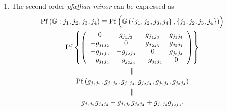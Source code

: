 \documentclass[aps,preprint]{revtex4}%
\begin{document}
\begin{enumerate}
\begin{enumerate}
\end{enumerate}

\item The second order \emph{pfaffian minor} can be expressed as
\begin{gather}
\operatorname{Pf}\left(  \mathbb{G}:j_{1},j_{2},j_{3},j_{4}\right)
\equiv\operatorname{Pf}\left(  \overset{}{\mathbb{G}\left(  \left\{
j_{1},j_{2},j_{3},j_{4}\right\}  ,\left\{  j_{1},j_{2},j_{3},j_{4}\right\}
\right)  }\right) \\
\operatorname{Pf}\left\{  \left(
\begin{array}
[c]{cccc}%
0 & g_{j_{1}j_{2}} & g_{j_{1}j_{3}} & g_{j_{1}j_{4}}\\
-g_{j_{1}j_{2}} & 0 & g_{j_{2}j_{3}} & g_{j_{2}j_{4}}\\
-g_{j_{1}j_{3}} & -g_{j_{2}j_{3}} & 0 & g_{j_{3}j_{4}}\\
-g_{j_{1}j_{4}} & -g_{j_{2}j_{4}} & -g_{j_{3}j_{4}} & 0
\end{array}
\right)  \right\} \\
\parallel\\
\operatorname{Pf}\left(  g_{j_{1}j_{2}},g_{j_{1}j_{3}},g_{j_{1}j_{4}}%
,g_{j_{2}j_{3}},g_{j_{2}j_{4}},g_{j_{3}j_{4}}\right) \\
\parallel\\
g_{j_{1}j_{2}}g_{j_{3}j_{4}}-g_{j_{1}j_{3}}g_{j_{2}j_{4}}+g_{j_{1}j_{4}%
}g_{j_{2}j_{3}}.
\end{gather}



\end{enumerate}
\end{document}
